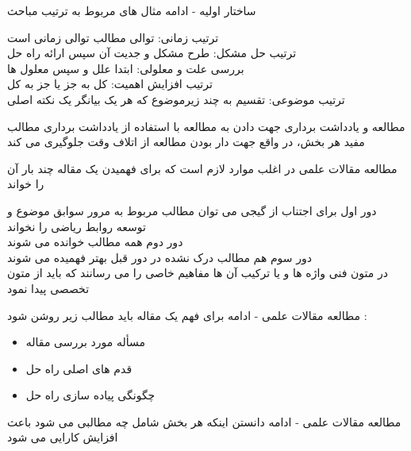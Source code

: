 \documentclass[14pt]{beamer}
\makeatletter
\newcommand{\rtlist}{\raggedleft\rightskip\@totalleftmargin}
\newcommand{\framefontsizelarge}{\fontsize{18pt}{0pt}\selectfont}
\newcommand{\frametitlefontsize}{\fontsize{20pt}{0pt}\selectfont}
\makeatother
\begin{document}
\begin{persian}
	\begin{frame}{\frametitlefontsize ساختار اولیه - ادامه}
		مثال های مربوط به ترتیب مباحث
		
		ترتیب زمانی: توالی مطالب توالی زمانی است \\
		ترتیب حل مشکل: طرح مشکل و جدیت آن سپس ارائه راه حل \\
		بررسی علت و معلولی: ابتدا علل و سپس معلول ها \\ 
		ترتیب افزایش اهمیت: کل به جز یا جز به کل \\ 
		ترتیب موضوعی: تقسیم به چند زیرموضوع که هر یک بیانگر یک نکته اصلی 
	\end{frame}
	
	\begin{frame}{\frametitlefontsize مطالعه و یادداشت برداری}
		\framefontsizelarge
		جهت دادن به مطالعه با استفاده از یادداشت برداری مطالب مفید هر بخش، در واقع جهت دار بودن مطالعه از اتلاف وقت جلوگیری می کند
	\end{frame}

	\begin{frame}{\frametitlefontsize مطالعه مقالات علمی}
		در اغلب موارد لازم است که برای فهمیدن یک مقاله چند بار آن را خواند
		
		دور اول برای اجتناب از گیجی می توان مطالب مربوط به مرور سوابق موضوع و توسعه روابط ریاضی را نخواند\\
		دور دوم همه مطالب خوانده می شوند\\
		دور سوم هم مطالب درک نشده در دور قبل بهتر فهمیده می شوند\\
		در متون فنی واژه ها و یا ترکیب آن ها مفاهیم خاصی را می رسانند که باید از متون تخصصی پیدا نمود
		
	\end{frame}
	
	\begin{frame}{\frametitlefontsize مطالعه مقالات علمی - ادامه}
		برای فهم یک مقاله باید مطالب زیر روشن شود :\\
		\begin{itemize}\rtlist
			\item مسأله مورد بررسی مقاله
			\item قدم های اصلی راه حل
			\item چگونگی پیاده سازی راه حل
		\end{itemize}
	\end{frame}
	
	\begin{frame}{\frametitlefontsize مطالعه مقالات علمی - ادامه}
		دانستن اینکه هر بخش شامل چه مطالبی می شود باعث افزایش کارایی می شود\\
		

\end{frame}
\end{persian}
\end{document}
